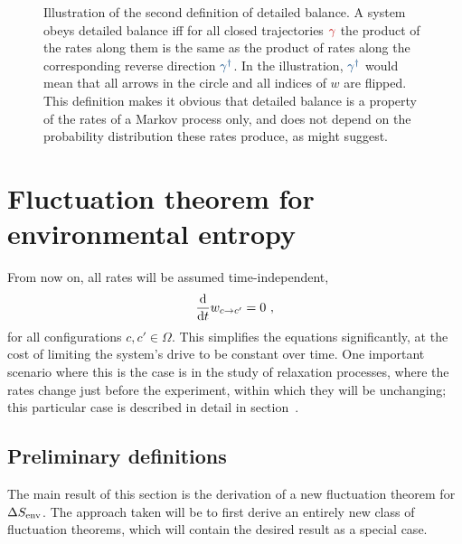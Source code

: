 \begin{figure}[htb]
	\centering
	
	\caption[]{Illustration of the second definition of detailed balance. A system obeys detailed balance iff for all closed trajectories \({\color{red}\gamma}\) the product of the rates along them is the same as the product of rates along the corresponding reverse direction \({\color{blue}\gamma^\dagger}\). In the illustration, \({\color{blue}\gamma^\dagger}\) would mean that all arrows in the circle and all indices of \(w\) are flipped. This definition makes it obvious that detailed balance is a property of the rates of a Markov process only, and does not depend on the probability distribution these rates produce, as  might suggest.}
	\label{fig:pathcircle}
\end{figure}




\section{Fluctuation theorem for environmental entropy}


From now on, all rates will be assumed time-independent,
\begin{equation}
	\frac{\mathrm{d} }{\mathrm{d} t}w_{c\to c'} = 0 ~,
\end{equation}
%
for all configurations \(c, c'\in\Omega\). This simplifies the equations significantly, at the cost of limiting the system's drive to be constant over time. One important scenario where this is the case is in the study of relaxation processes, where the rates change just before the experiment, within which they will be unchanging; this particular case is described in detail in section~.



\subsection{Preliminary definitions}

The main result of this section is the derivation of a new fluctuation theorem for \(\Delta S_\text{env}\). The approach taken will be to first derive an entirely new class of fluctuation theorems, which will contain the desired result as a special case.

